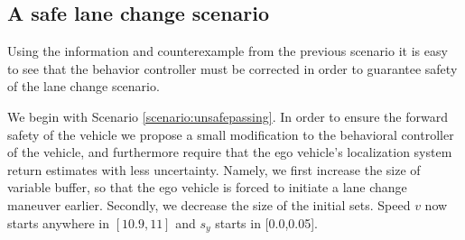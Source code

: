 	

%	

\subsection{A safe lane change scenario}
Using the information and counterexample from the previous scenario it is easy to see that the behavior controller must be corrected in order to guarantee safety of the lane change scenario. 
\begin{scenario}
	\label{scenario:safepassing}
	We begin with Scenario \ref{scenario:unsafepassing}.
	In order to ensure the forward safety of the vehicle we propose a small modification to the behavioral controller of the vehicle, and furthermore require that the ego vehicle's localization system return estimates with less uncertainty. 
	Namely, we first increase the size of variable buffer, so that the ego vehicle is forced to initiate a lane change maneuver earlier.
	Secondly, we decrease the size of the initial sets.
	Speed $v$ now starts anywhere in $[10.9,11]$ and $s_y$ starts in [0.0,0.05].\\
\end{scenario}

